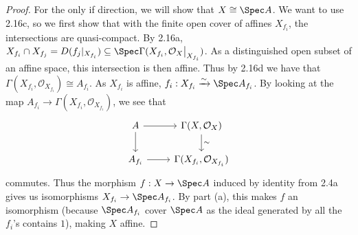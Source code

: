 \begin{exercise}
\begin{enumerate}[(a)]
\begin{proof}
		For the only if direction, we will show that $X \cong \Spec A $.
		We want to use 2.16c, so we first show that with the finite open cover of affines $X_{f_i} $, the intersections are quasi-compact.
		By 2.16a, $X_{f_i}\cap X_{f_j} = D(f_j|_{X_{f_i}})  \subseteq \Spec \Gamma(X_{f_i},\mathcal{O}_X\big|_{X_{f_i}})$.
		As a distinguished open subset of an affine space, this intersection is then affine.
		Thus by 2.16d we have that $\Gamma(X_{f_i},\mathcal{O}_{X_{f_i}}) \cong A_{f_i} $.
		As $X_{f_i}$ is affine, $f_i: X_{f_i}\xrightarrow{\sim} \Spec A_{f_i} $.
		By looking at the map $A_{f_i}\to \Gamma(X_{f_i}, \mathcal{O}_{X_{f_i}}) $, we see that
		\[
		\begin{tikzcd}
		A & \Gamma(X, \mathcal{O}_X)\\
		A_{f_i} & \Gamma(X_{f_i},\mathcal{O}_{X_{f_i}})
		\arrow[from=1-1,to=1-2]
		\arrow[from=1-1,to=2-1]
		\arrow[from=2-1,to=2-2]
		\arrow["\sim",from=1-2,to=2-2]
		\end{tikzcd}
		\]
		commutes.
		Thus the morphism $f:X\to \Spec A $ induced by identity from 2.4a gives us isomorphisms $X_{f_i}\to \Spec A_{f_i} $.
		By part (a), this makes $f $ an isomorphism (because $\Spec A_{f_i} $ cover $\Spec A $ as the ideal generated by all the $f_i $'s contains $1$), making $X $ affine.
	\end{proof}
\end{enumerate}
\end{exercise}

